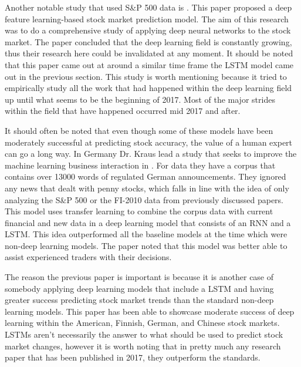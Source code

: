 \documentclass{article}
\theoremstyle{plain}
\theoremstyle{definition}
\numberwithin{equation}{section}
\numberwithin{theorem}{section}
\numberwithin{lemma}{section}
\numberwithin{definition}{section}
\numberwithin{proposition}{section}
\numberwithin{corollary}{section}
\begin{document}
	 
	 Another notable study that used S\&P 500 data is \cite{Chong2017}. This paper proposed a deep feature learning-based stock market prediction model. The aim of this research was to do a comprehensive study of applying deep neural networks to the stock market. The paper concluded that the deep learning field is constantly growing, thus their research here could be invalidated at any moment. It should be noted that this paper came out at around a similar time frame the LSTM model came out in the previous section. This study is worth mentioning because it tried to empirically study all the work that had happened within the deep learning field up until what seems to be the beginning of 2017. Most of the major strides within the field that have happened occurred mid 2017 and after.
	 
	 
	 It should often be noted that even though some of these models have been moderately successful at predicting stock accuracy, the value of a human expert can go a long way. In Germany Dr. Kraus lead a study that seeks to improve the machine learning business interaction in \cite{Kraus2017}. For data they have a corpus that contains over 13000 words of regulated German announcements. They ignored any news that dealt with penny stocks, which falls in line with the idea of only analyzing the S\&P 500 or the FI-2010 data from previously discussed papers. This model uses transfer learning to combine the corpus data with current financial and new data in a deep learning model that consists of an RNN and a LSTM. This idea outperformed all the baseline models at the time which were non-deep learning models. The paper noted that this model was better able to assist experienced traders with their decisions. 
	 
	
	 The reason the previous paper is important is because it is another case of somebody applying deep learning models that include a LSTM and having greater success predicting stock market trends than the standard non-deep learning models. This paper has been able to showcase moderate success of deep learning within the American, Finnish, German, and Chinese stock markets. LSTMs aren't necessarily the answer to what should be used to predict stock market changes, however it is worth noting that in pretty much any research paper that has been published in 2017, they outperform the standards.
	 
\end{document}
